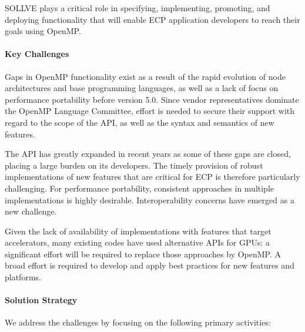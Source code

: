  SOLLVE plays a critical role in specifying, implementing, promoting, and deploying functionality that will enable ECP application developers to reach their goals using OpenMP.

\paragraph{Key Challenges}
Gaps in OpenMP functionality exist as a result of the rapid evolution of node architectures and  base programming languages, as well as a lack of focus on performance portability before version 5.0.  
 Since vendor representatives dominate the  OpenMP Language Committee, effort is needed  to secure their support with regard to the scope of the API, as well as  the syntax and semantics of new features.

The API has greatly expanded in recent years as some of these gaps are closed, placing a large burden on its developers. The timely provision of robust implementations of new features that are critical for ECP is therefore particularly challenging.
For performance portability, consistent approaches in multiple implementations is highly desirable. Interoperability concerns have emerged as a new challenge.

Given the lack of availability of implementations with features that target accelerators, many existing codes have used alternative APIs for GPUs: a significant effort will be required to replace those approaches by OpenMP. A broad effort is required to develop and apply best practices for new features and platforms. 

\paragraph{Solution Strategy}
We address the challenges by focusing on the following primary activities:

